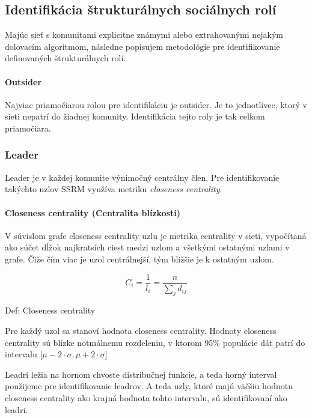 \documentclass[slovak,master,public,dept460,male,cpdeclaration,oneside]{diploma}
\begin{document}
\subsection{Identifikácia štrukturálnych sociálnych rolí} \label{identifikacia}
Majúc sieť s komunitami explicitne známymi alebo extrahovanými nejakým dolovacím algoritmom, následne popisujem metodológie pre identifikovanie definovaných štrukturálnych rolí.

\paragraph{Outsider}
\hfill \break
Najviac priamočiarou rolou pre identifikáciu je outsider. Je to jednotlivec, ktorý v sieti nepatrí do žiadnej komunity. Identifikácia tejto roly je tak celkom priamočiara.


\subsubsection{Leader}

Leader je v každej komunite výnimočný centrálny člen. Pre identifikovanie takýchto uzlov SSRM využíva metriku \textit{closeness centrality}.

\paragraph{Closeness centrality (Centralita blízkosti)}
\hfill \break
V súvislom grafe closeness centrality uzlu je metrika centrality v sieti, vypočítaná ako súčet dĺžok najkratsích ciest medzi uzlom a všetkými ostatnými uzlami v grafe. Čiže čím viac je uzol centrálnejší, tým bližšie je k ostatným uzlom.


\begin{mycapequ}[!ht]
      \begin{equation*}
     C_{i} = \frac{1}{l_{i}}=\frac{n}{\sum_{j}d_{ij}}
   \end{equation*}
   \caption{Def: Closeness centrality}
\end{mycapequ}


\begin{sloppypar}
Pre každý uzol sa stanoví hodnota closeness centrality. Hodnoty closeness centrality sú blízke notmálnemu rozdeleniu, v ktorom 95\% populácie dát patrí do intervalu ${\big[ \mu - 2\cdot\sigma, \mu + 2\cdot\sigma \big]}$
\end{sloppypar}

Leadri ležia na hornom chvoste distribučnej funkcie, a teda horný interval použijeme pre identifikovanie leadrov. A teda uzly, ktoré majú väčšiu hodnotu closeness centrality ako krajná hodnota tohto intervalu, sú identifikovaní ako leadri.
\end{document}

